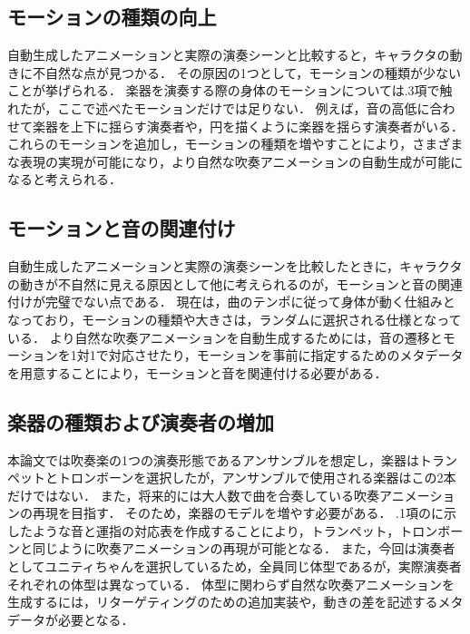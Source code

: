 \newpage
\subsection{モーションの種類の向上}
自動生成したアニメーションと実際の演奏シーンと比較すると，キャラクタの動きに不自然な点が見つかる．
その原因の1つとして，モーションの種類が少ないことが挙げられる．
楽器を演奏する際の身体のモーションについては{.3項}で触れたが，ここで述べたモーションだけでは足りない．
例えば，音の高低に合わせて楽器を上下に揺らす演奏者や，円を描くように楽器を揺らす演奏者がいる．
これらのモーションを追加し，モーションの種類を増やすことにより，さまざまな表現の実現が可能になり，より自然な吹奏アニメーションの自動生成が可能になると考えられる．

\subsection{モーションと音の関連付け}
自動生成したアニメーションと実際の演奏シーンを比較したときに，キャラクタの動きが不自然に見える原因として他に考えられるのが，モーションと音の関連付けが完璧でない点である．
現在は，曲のテンポに従って身体が動く仕組みとなっており，モーションの種類や大きさは，ランダムに選択される仕様となっている．
より自然な吹奏アニメーションを自動生成するためには，音の遷移とモーションを1対1で対応させたり，モーションを事前に指定するためのメタデータを用意することにより，モーションと音を関連付ける必要がある．

\subsection{楽器の種類および演奏者の増加}
本論文では吹奏楽の1つの演奏形態であるアンサンブルを想定し，楽器はトランペットとトロンボーンを選択したが，アンサンブルで使用される楽器はこの2本だけではない．
また，将来的には大人数で曲を合奏している吹奏アニメーションの再現を目指す．
そのため，楽器のモデルを増やす必要がある．
{.1項}のに示したような音と運指の対応表を作成することにより，トランペット，トロンボーンと同じように吹奏アニメーションの再現が可能となる．
また，今回は演奏者としてユニティちゃんを選択しているため，全員同じ体型であるが，実際演奏者それぞれの体型は異なっている．
体型に関わらず自然な吹奏アニメーションを生成するには，リターゲティングのための追加実装や，動きの差を記述するメタデータが必要となる．